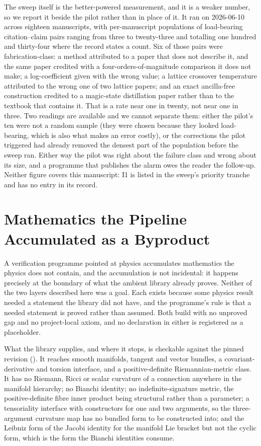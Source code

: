 \documentclass[11pt]{article}
\begin{document}
The sweep itself is the better-powered measurement, and it is a
weaker number, so we report it beside the pilot rather than in place
of it. It ran on 2026-06-10 across eighteen manuscripts, with
per-manuscript populations of load-bearing citation--claim pairs
ranging from three to twenty-three and totalling one hundred and
thirty-four where the record states a count. Six of those pairs were
fabrication-class: a method attributed to a paper that does not
describe it, and the same paper credited with a four-orders-of-magnitude
comparison it does not make; a log-coefficient given with the wrong
value; a lattice crossover temperature attributed to the wrong one of
two lattice papers; and an exact ancilla-free construction credited to
a magic-state distillation paper rather than to the textbook that
contains it. That is a rate near one in twenty, not near one in three.
Two readings are available and we cannot separate them: either the
pilot's ten were not a random sample (they were chosen because they
looked load-bearing, which is also what makes an error costly), or
the corrections the pilot triggered had already removed the densest
part of the population before the sweep ran. Either way the pilot was
right about the failure class and wrong about its size, and a
programme that publishes the alarm owes the reader the follow-up.
Neither figure covers this manuscript: I1 is listed in the sweep's
priority tranche and has no entry in its record.

\section{Mathematics the Pipeline Accumulated as a Byproduct}
\label{sec:phase6f_substrate}

A verification programme pointed at physics accumulates mathematics the
physics does not contain, and the accumulation is not incidental: it
happens precisely at the boundary of what the ambient library already
proves. Neither of the two layers described here was a goal. Each exists
because some physics result needed a statement the library did not have,
and the programme's rule is that a needed statement is proved rather
than assumed. Both build with no unproved gap and no project-local
axiom, and no declaration in either is registered as a placeholder.

What the library supplies, and where it stops, is checkable against the
pinned revision (\mathlibrev{}). It reaches smooth manifolds, tangent
and vector bundles, a covariant-derivative and torsion interface, and a
positive-definite Riemannian-metric class. It has no Riemann, Ricci or
scalar curvature of a connection anywhere in the manifold hierarchy; no
Bianchi identity; no indefinite-signature metric, the positive-definite
fibre inner product being structural rather than a parameter; a
tensoriality interface with constructors for one and two arguments, so
the three-argument curvature map has no bundled form to be constructed
into; and the Leibniz form of the Jacobi identity for the manifold Lie
bracket but not the cyclic form, which is the form the Bianchi
identities consume.
\end{document}

